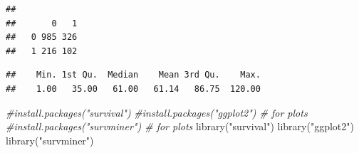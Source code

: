 \documentclass[
  10pt,
]{book}
\newenvironment{Shaded}{\begin{snugshade}}{\end{snugshade}}
\newcommand{\CommentTok}[1]{\textcolor[rgb]{0.56,0.35,0.01}{\textit{#1}}}
\newcommand{\DecValTok}[1]{\textcolor[rgb]{0.00,0.00,0.81}{#1}}
\newcommand{\FunctionTok}[1]{\textcolor[rgb]{0.00,0.00,0.00}{#1}}
\newcommand{\NormalTok}[1]{#1}
\newcommand{\OtherTok}[1]{\textcolor[rgb]{0.56,0.35,0.01}{#1}}
\newcommand{\SpecialCharTok}[1]{\textcolor[rgb]{0.00,0.00,0.00}{#1}}
\newcommand{\StringTok}[1]{\textcolor[rgb]{0.31,0.60,0.02}{#1}}
\begin{document}
\begin{Shaded}
\end{Shaded}

\begin{verbatim}
##    
##       0   1
##   0 985 326
##   1 216 102
\end{verbatim}

\begin{Shaded}
\end{Shaded}

\begin{verbatim}
##    Min. 1st Qu.  Median    Mean 3rd Qu.    Max. 
##    1.00   35.00   61.00   61.14   86.75  120.00
\end{verbatim}

\begin{Shaded}
\begin{Highlighting}[]
\CommentTok{\#install.packages("survival")}
\CommentTok{\#install.packages("ggplot2") \# for plots}
\CommentTok{\#install.packages("survminer") \# for plots}
\FunctionTok{library}\NormalTok{(}\StringTok{"survival"}\NormalTok{)}
\FunctionTok{library}\NormalTok{(}\StringTok{"ggplot2"}\NormalTok{)}
\FunctionTok{library}\NormalTok{(}\StringTok{"survminer"}\NormalTok{)}
\end{Highlighting}
\end{Shaded}
\end{document}
